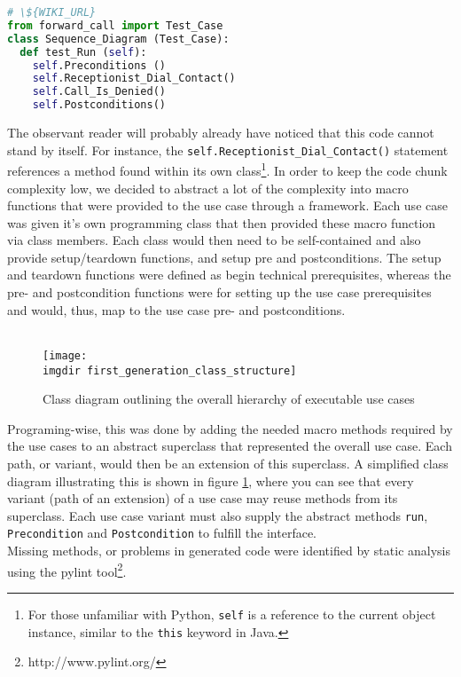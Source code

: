 \begin{lstlisting}[language=Python, caption=Example generated Python code output, label=lst:example_python_output]
# \${WIKI_URL}
from forward_call import Test_Case
class Sequence_Diagram (Test_Case):
  def test_Run (self):
    self.Preconditions ()
    self.Receptionist_Dial_Contact()
    self.Call_Is_Denied()
    self.Postconditions()

\end{lstlisting}

\noindent
The observant reader will probably already have noticed that this code cannot stand by itself. For instance, the \texttt{self.Receptionist\_Dial\_Contact()} statement references a method found within its own class\footnote{For those unfamiliar with Python, \texttt{self} is a reference to the current object instance, similar to the \texttt{this} keyword in Java.}. In order to keep the code chunk complexity low, we decided to abstract a lot of the complexity into macro functions that were provided to the use case through a framework. Each use case was given it's own programming class that then provided these macro function via class members. Each class would then need to be self-contained and also provide setup/teardown functions, and setup pre and postconditions. The setup and teardown functions were defined as begin technical prerequisites, whereas the pre- and postcondition functions were for setting up the use case prerequisites and would, thus, map to the use case pre- and postconditions.\\\\
\begin{figure}[!h]
\centering
\texttt{[image: \\imgdir first\_generation\_class\_structure]}
\caption{Class diagram outlining the overall hierarchy of executable use cases}
\label{fig:first_generation_class_structure}
\end{figure}
Programing-wise, this was done by adding the needed macro methods required by the use cases to an abstract superclass that represented the overall use case. Each path, or variant, would then be an extension of this superclass. A simplified class diagram illustrating this is shown in figure \ref{fig:first_generation_class_structure}, where you can see that every variant (path of an extension) of a use case may reuse methods from its superclass. Each use case variant must also supply the abstract methods \texttt{run}, \texttt{Precondition} and \texttt{Postcondition} to fulfill the interface.\\
Missing methods, or problems in generated code were identified by static analysis using the pylint tool\footnote{http://www.pylint.org/}.
\newpage
